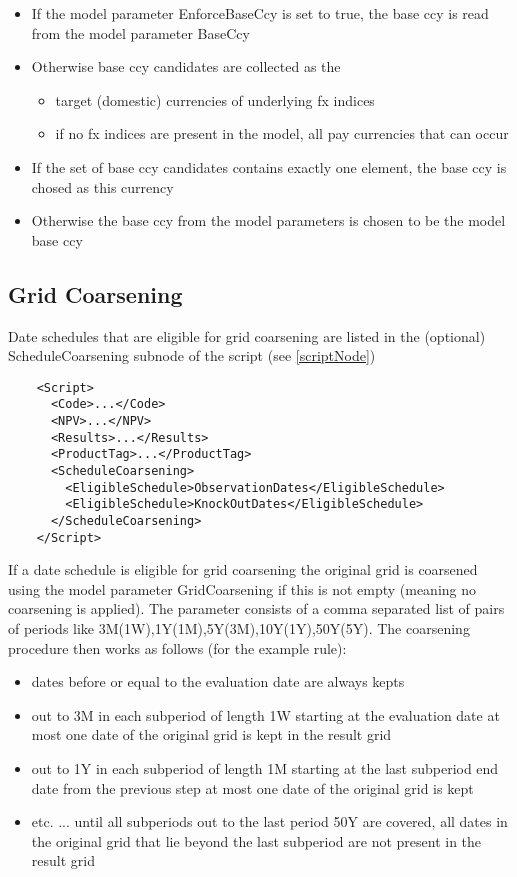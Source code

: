 \begin{itemize}
\item If the model parameter EnforceBaseCcy is set to true, the base ccy is read from the model parameter BaseCcy
\item Otherwise base ccy candidates are collected as the
  \begin{itemize}
    \item target (domestic) currencies of underlying fx indices
    \item if no fx indices are present in the model, all pay currencies that can occur
  \end{itemize}
\item If the set of base ccy candidates contains exactly one element, the base ccy is chosed as this currency
\item Otherwise the base ccy from the model parameters is chosen to be the model base ccy
\end{itemize}

\subsection{Grid Coarsening}\label{grid_coarsening}

Date schedules that are eligible for grid coarsening are listed in the (optional) ScheduleCoarsening subnode of the
script (see \ref{scriptNode})

\begin{verbatim}
    <Script>
      <Code>...</Code>
      <NPV>...</NPV>
      <Results>...</Results>
      <ProductTag>...</ProductTag>
      <ScheduleCoarsening>
        <EligibleSchedule>ObservationDates</EligibleSchedule>
        <EligibleSchedule>KnockOutDates</EligibleSchedule>
      </ScheduleCoarsening>
    </Script>
\end{verbatim}

If a date schedule is eligible for grid coarsening the original grid is coarsened using the model parameter
GridCoarsening if this is not empty (meaning no coarsening is applied). The parameter consists of a comma separated list
of pairs of periods like 3M(1W),1Y(1M),5Y(3M),10Y(1Y),50Y(5Y). The coarsening procedure then works as follows (for the
example rule):

\begin{itemize}
\item dates before or equal to the evaluation date are always kepts
\item out to 3M in each subperiod of length 1W starting at the evaluation date at most one date of the original grid is
  kept in the result grid
\item out to 1Y in each subperiod of length 1M starting at the last subperiod end date from the previous step at most
  one date of the original grid is kept
\item etc. ... until all subperiods out to the last period 50Y are covered, all dates in the original grid that lie
  beyond the last subperiod are not present in the result grid
\end{itemize}

